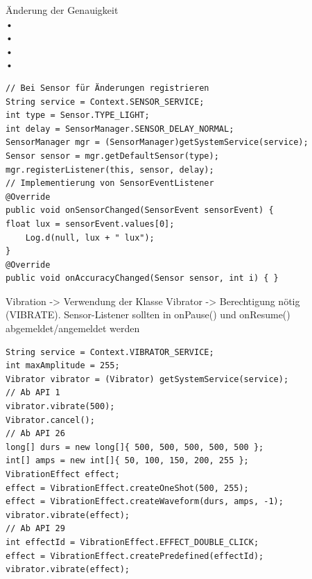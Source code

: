 \documentclass[10pt,landscape,a4paper]{article}
\begin{document}
\begin{multicols*}{3}
Änderung der Genauigkeit\\
• \\
• \\
• \\
• \\
\begin{verbatim}
// Bei Sensor für Änderungen registrieren
String service = Context.SENSOR_SERVICE;
int type = Sensor.TYPE_LIGHT;
int delay = SensorManager.SENSOR_DELAY_NORMAL;
SensorManager mgr = (SensorManager)getSystemService(service);
Sensor sensor = mgr.getDefaultSensor(type);
mgr.registerListener(this, sensor, delay);
// Implementierung von SensorEventListener
@Override
public void onSensorChanged(SensorEvent sensorEvent) {
float lux = sensorEvent.values[0];
    Log.d(null, lux + " lux");
}
@Override
public void onAccuracyChanged(Sensor sensor, int i) { }

\end{verbatim}
Vibration -> 
Verwendung der Klasse Vibrator ->
Berechtigung nötig (VIBRATE). Sensor-Listener sollten in onPause() und onResume() abgemeldet/angemeldet werden
\begin{verbatim}
String service = Context.VIBRATOR_SERVICE;
int maxAmplitude = 255;
Vibrator vibrator = (Vibrator) getSystemService(service);
// Ab API 1
vibrator.vibrate(500);
Vibrator.cancel();
// Ab API 26
long[] durs = new long[]{ 500, 500, 500, 500, 500 };
int[] amps = new int[]{ 50, 100, 150, 200, 255 };
VibrationEffect effect;
effect = VibrationEffect.createOneShot(500, 255);
effect = VibrationEffect.createWaveform(durs, amps, -1);
vibrator.vibrate(effect);
// Ab API 29
int effectId = VibrationEffect.EFFECT_DOUBLE_CLICK;
effect = VibrationEffect.createPredefined(effectId);
vibrator.vibrate(effect);
\end{verbatim}

\end{multicols*}
\end{document}

